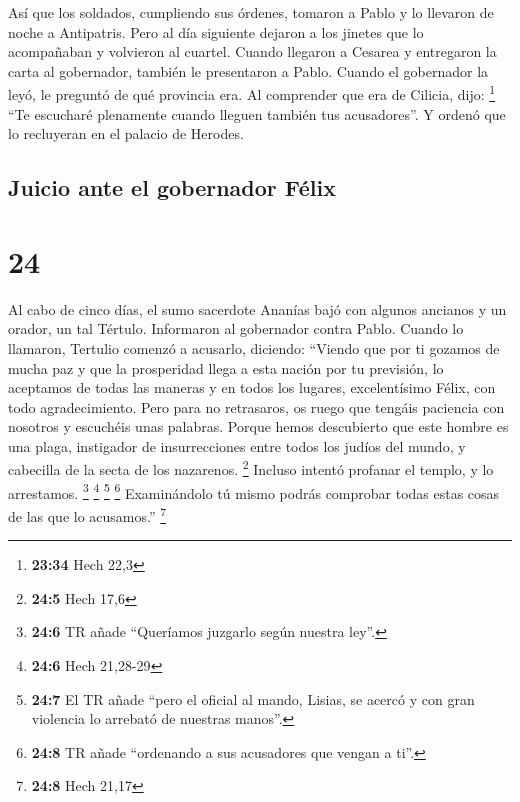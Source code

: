  Así que los soldados, cumpliendo sus órdenes, tomaron a
Pablo y lo llevaron de noche a Antipatris.  Pero al día
siguiente dejaron a los jinetes que lo acompañaban y volvieron al
cuartel.  Cuando llegaron a Cesarea y entregaron la carta
al gobernador, también le presentaron a Pablo.  Cuando el
gobernador la leyó, le preguntó de qué provincia era. Al comprender que
era de Cilicia, dijo: \footnote{\textbf{23:34} Hech 22,3}
 ``Te escucharé plenamente cuando lleguen también tus
acusadores''. Y ordenó que lo recluyeran en el palacio de Herodes.

\hypertarget{juicio-ante-el-gobernador-fuxe9lix}{%
\subsection{Juicio ante el gobernador
Félix}\label{juicio-ante-el-gobernador-fuxe9lix}}

\hypertarget{section-23}{%
\section{24}\label{section-23}}

 Al cabo de cinco días, el sumo sacerdote Ananías bajó con
algunos ancianos y un orador, un tal Tértulo. Informaron al gobernador
contra Pablo.  Cuando lo llamaron, Tertulio comenzó a
acusarlo, diciendo: ``Viendo que por ti gozamos de mucha paz y que la
prosperidad llega a esta nación por tu previsión,  lo
aceptamos de todas las maneras y en todos los lugares, excelentísimo
Félix, con todo agradecimiento.  Pero para no retrasaros,
os ruego que tengáis paciencia con nosotros y escuchéis unas palabras.
 Porque hemos descubierto que este hombre es una plaga,
instigador de insurrecciones entre todos los judíos del mundo, y
cabecilla de la secta de los nazarenos. \footnote{\textbf{24:5} Hech
  17,6}  Incluso intentó profanar el templo, y lo
arrestamos. \footnote{\textbf{24:6} TR añade ``Queríamos juzgarlo según
  nuestra ley''.} \footnote{\textbf{24:6} Hech 21,28-29} 
\footnote{\textbf{24:7} El TR añade ``pero el oficial al mando, Lisias,
  se acercó y con gran violencia lo arrebató de nuestras manos''.}
 \footnote{\textbf{24:8} TR añade ``ordenando a sus
  acusadores que vengan a ti''.} Examinándolo tú mismo podrás comprobar
todas estas cosas de las que lo acusamos.'' \footnote{\textbf{24:8} Hech
  21,17}

